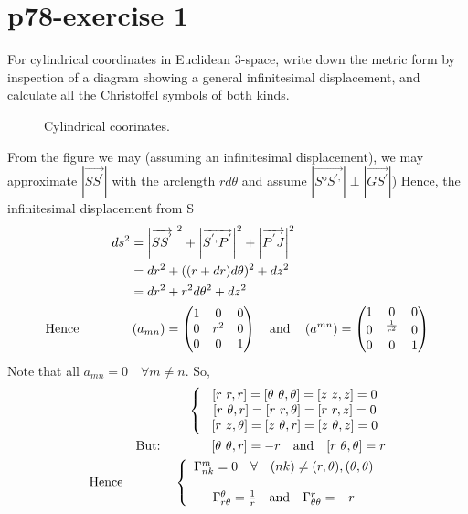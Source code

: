 \section{p78-exercise 1}
\begin{tcolorbox}
For cylindrical coordinates in Euclidean 3-space, write down the metric form by inspection of a diagram showing a general infinitesimal displacement, and calculate all the Christoffel symbols of both kinds.
\end{tcolorbox}
\begin{figure}[h]
\centering

\caption{Cylindrical coorinates. }
\label{fig:fig_p78_247_a}
\end{figure}
From the figure we may (assuming an infinitesimal displacement), we may approximate $\left| \overrightarrow{SS^{'}} \right|$ with the arclength $r d\theta$ and assume $\left|  \overrightarrow{S°S^{',}} \right| \perp \left|  \overrightarrow{GS^{'}} \right|$) Hence, the infinitesimal displacement from S
\begin{align}
\ ds^2 &= \left| \overrightarrow{SS^{'}} \right|^2 + \left| \overrightarrow{S^{',}P^{'}} \right|^2+\left| \overrightarrow{P^{'}J} \right|^2\\
\ &= dr^2 + ((r+dr)d\theta)^2 + dz^2\\
\ &= dr^2 + r^2d\theta^2 + dz^2\\
\text{Hence} \quad\quad\quad\quad &\left(a_{mn}\right) = \begin{pmatrix}
 1& 0 & 0 \\
 0&  r^2&0  \\
 0&0  &1  \\
\end{pmatrix}\quad\text{and}\quad \left(a^{mn}\right) = \begin{pmatrix}
 1& 0 & 0 \\
 0&  ^\frac{1}{r^2}&0  \\
 0&0  &1  \\
\end{pmatrix}
\end{align}
Note that all $a_{mn} = 0 \quad \forall m\ne n$. So,
\begin{align}
\left \{ \begin{array}{c}
\ [r \ r,r]=[\theta \  \theta, \theta] = [z \ z,z] = 0\\
\ [r \ \theta,r]=[r \ r, \theta] = [r \ r,z] = 0\\
\ [r \ z,\theta]=[z \  \theta, r] = [z \ \theta,z] = 0\\
\end{array}\right.\\
\text{But:}\quad\quad\quad\quad [\theta \ \theta,r]= -r \quad\text{and}\quad [r \  \theta, \theta] = r\\
\text{Hence}\quad\quad\quad\quad \left \{ \begin{array}{c}
\Gamma^m_{nk} = 0 \quad\forall\quad (nk) \ne (r, \theta), (\theta, \theta)\\\\
\Gamma^{\theta}_{r\theta} = \frac{1}{r} \quad\text{and}\quad \Gamma^r_{\theta\theta} = -r
\end{array}\right.\
\end{align}

